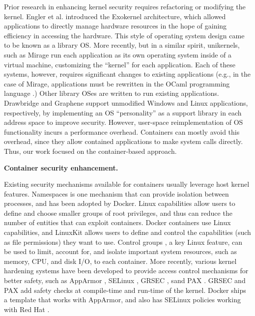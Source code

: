 Prior research in enhancing kernel security requires refactoring or modifying the kernel. 
Engler et al. \cite{Engler:1995:EOS:224056.224076} introduced the Exokernel architecture, which allowed applications to directly manage hardware resources in the hope of gaining efficiency in accessing the hardware. 
This style of operating system design came to be known as a library OS. More recently, but in a similar spirit, unikernels, 
such as Mirage \cite{Madhavapeddy:2013:ULO:2451116.2451167} run each application as its own operating system inside of a virtual machine, customizing the ``kernel'' for each application. 
Each of these systems, however, requires significant changes to existing applications (e.g., in the case of Mirage, applications must be rewritten in the OCaml programming language \cite{OCaml}.) 
Other library OSes are written to run existing applications. Drawbridge \cite{Porter:2011:RLO:1950365.1950399} and Graphene \cite{Tsai:2014:CSI:2592798.2592812} support unmodified Windows and Linux applications, 
respectively, by implementing an OS ``personality'' as a support library in each address space to improve security. 
However, user-space reimplementation of OS functionality incurs a performance overhead. Containers can mostly avoid this overhead, since they allow contained applications to make system calls directly. 
Thus, our work focused on the container-based approach. 

\textbf{Container security enhancement.} 

Existing security mechanisms available for containers usually leverage host kernel features. Namespaces \cite{namespaces} is one mechanism that can provide isolation between processes, and has been adopted by Docker. 
Linux capabilities \cite{linux-kernel-capabilities} allow users to define and choose smaller groups of root privileges, and thus can reduce the number of entities that can exploit containers. 
Docker containers use Linux capabilities, and LinuxKit allows users to define and control the capabilities (such as file permissions) they want to use. 
Control groups \cite{cgroups}, a key Linux feature, can be used to limit, account for, and isolate important system resources, such as memory, CPU, and disk I/O, to each container. 
More recently, various kernel hardening systems have been developed to provide access control mechanisms for better safety, 
such as AppArmor \cite{AppArmor}, SELinux \cite{SELinux}, GRSEC \cite{GRSEC},  sand PAX \cite{PAX}. 
GRSEC and PAX add safety checks at compile-time and run-time of the kernel. Docker ships a template that works with AppArmor, and also has SELinux policies working with Red Hat \cite{red-hat}. 

